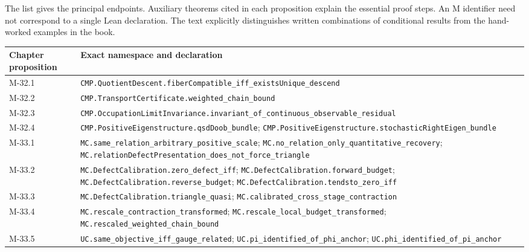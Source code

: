 \documentclass[
  english,
  11pt,
  oneside]{book}
\newcounter{none} %
\begin{document}
The list gives the principal endpoints. Auxiliary theorems cited in each proposition explain the essential proof steps. An M identifier need not correspond to a single Lean declaration. The text explicitly distinguishes written combinations of conditional results from the hand-worked examples in the book.

{\def\LTcaptype{none} %
\begin{longtable}[]{@{}
  >{\raggedright\arraybackslash}p{}
  >{\raggedright\arraybackslash}p{}@{}}
\toprule\noalign{}
\begin{minipage}[b]{\linewidth}\raggedright
Chapter proposition
\end{minipage} & \begin{minipage}[b]{\linewidth}\raggedright
Exact namespace and declaration
\end{minipage} \\
\midrule\noalign{}
\endhead
\bottomrule\noalign{}
\endlastfoot
M-32.1 & \nolinkurl{CMP.QuotientDescent.fiberCompatible_iff_existsUnique_descend} \\
M-32.2 & \nolinkurl{CMP.TransportCertificate.weighted_chain_bound} \\
M-32.3 & \nolinkurl{CMP.OccupationLimitInvariance.invariant_of_continuous_observable_residual} \\
M-32.4 & \nolinkurl{CMP.PositiveEigenstructure.qsdDoob_bundle}; \nolinkurl{CMP.PositiveEigenstructure.stochasticRightEigen_bundle} \\
M-33.1 & \nolinkurl{MC.same_relation_arbitrary_positive_scale}; \nolinkurl{MC.no_relation_only_quantitative_recovery}; \nolinkurl{MC.relationDefectPresentation_does_not_force_triangle} \\
M-33.2 & \nolinkurl{MC.DefectCalibration.zero_defect_iff}; \nolinkurl{MC.DefectCalibration.forward_budget}; \nolinkurl{MC.DefectCalibration.reverse_budget}; \nolinkurl{MC.DefectCalibration.tendsto_zero_iff} \\
M-33.3 & \nolinkurl{MC.DefectCalibration.triangle_quasi}; \nolinkurl{MC.calibrated_cross_stage_contraction} \\
M-33.4 & \nolinkurl{MC.rescale_contraction_transformed}; \nolinkurl{MC.rescale_local_budget_transformed}; \nolinkurl{MC.rescaled_weighted_chain_bound} \\
M-33.5 & \nolinkurl{UC.same_objective_iff_gauge_related}; \nolinkurl{UC.pi_identified_of_phi_anchor}; \nolinkurl{UC.phi_identified_of_pi_anchor} \\

\end{longtable}}
\end{document}
